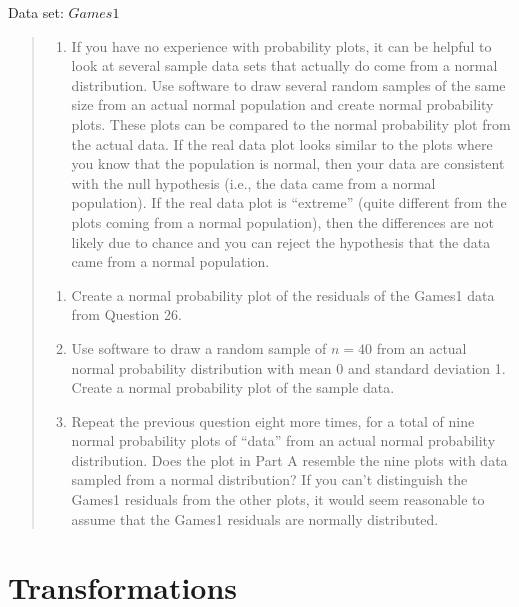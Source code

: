 \documentclass[
]{report}
\providecommand{\tightlist}{%
  \setlength{\itemsep}{0pt}\setlength{\parskip}{0pt}}
\begin{document}
Data set: \(Games1\)

\begin{quote}
\begin{enumerate}
\def\labelenumi{\arabic{enumi}.}
\setcounter{enumi}{29}
\tightlist
\item
  If you have no experience with probability plots, it can be helpful to look at several sample data sets that actually do come from a normal distribution. Use software to draw several random samples of the same size from an actual normal population and create normal probability plots. These plots can be compared to the normal probability plot from the actual data. If the real data plot looks similar to the plots where you know that the population is normal, then your data are consistent with the null hypothesis (i.e., the data came from a normal population). If the real data plot is ``extreme'' (quite different from the plots coming from a normal population), then the differences are not likely due to chance and you can reject the hypothesis that the data came from a normal population.\\
\end{enumerate}

\begin{enumerate}
\def\labelenumi{\alph{enumi}.}
\tightlist
\item
  Create a normal probability plot of the residuals of the Games1 data from Question 26.\\
\item
  Use software to draw a random sample of \(n = 40\) from an actual normal probability distribution with mean 0 and standard deviation 1. Create a normal probability plot of the sample data.\\
\item
  Repeat the previous question eight more times, for a total of nine normal probability plots of ``data'' from an actual normal probability distribution. Does the plot in Part A resemble the nine plots with data sampled from a normal distribution? If you can't distinguish the Games1 residuals from the other plots, it would seem reasonable to assume that the Games1 residuals are normally distributed.
\end{enumerate}
\end{quote}

\hypertarget{transformations}{%
\section{\texorpdfstring{\textbf{Transformations}}{Transformations}}\label{transformations}}
\end{document}
